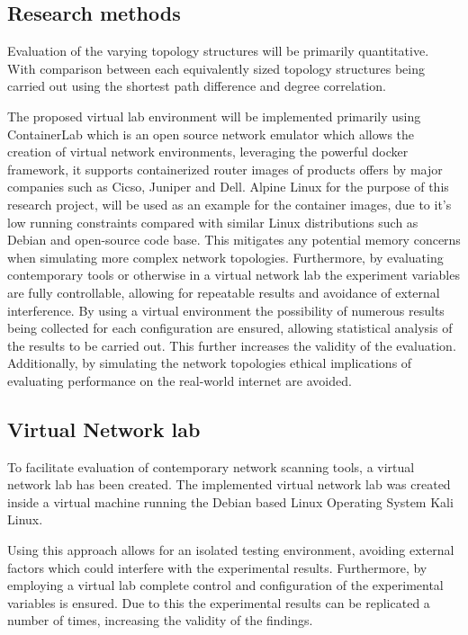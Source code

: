 \subsection{Research methods}
Evaluation of the varying topology structures will be primarily quantitative. With comparison between each equivalently sized topology structures being carried out using the shortest path difference and degree correlation. 

The proposed virtual lab environment will be implemented primarily using ContainerLab \cite{containerlab} which is an open source network emulator which allows the creation of virtual network environments, leveraging the powerful docker framework, it supports containerized router images of products offers by major companies such as Cicso, Juniper and Dell. Alpine Linux for the purpose of this research project, will be used as an example for the container images, due to it's low running constraints compared with similar Linux distributions such as Debian\cite{alpine} and open-source code base. This mitigates any potential memory concerns when simulating more complex network topologies. Furthermore, by evaluating contemporary tools or otherwise in a virtual network lab the experiment variables are fully controllable, allowing for repeatable results and avoidance of external interference. By using a virtual environment the possibility of numerous results being collected for each configuration are ensured, allowing statistical analysis of the results to be carried out. This further increases the validity of the evaluation. Additionally, by simulating the network topologies ethical implications of evaluating performance on the real-world internet are avoided. 



\subsection{Virtual Network lab}
To facilitate evaluation of contemporary network scanning tools, a virtual network lab has been created. The implemented virtual network lab was created inside a virtual machine running the Debian based Linux Operating System  Kali Linux. 

Using this approach allows for an isolated testing environment, avoiding external factors which could interfere with the experimental results. Furthermore, by employing a virtual lab complete control and configuration of the experimental variables is ensured. Due to this the experimental results can be replicated a number of times, increasing the validity of the findings. 

